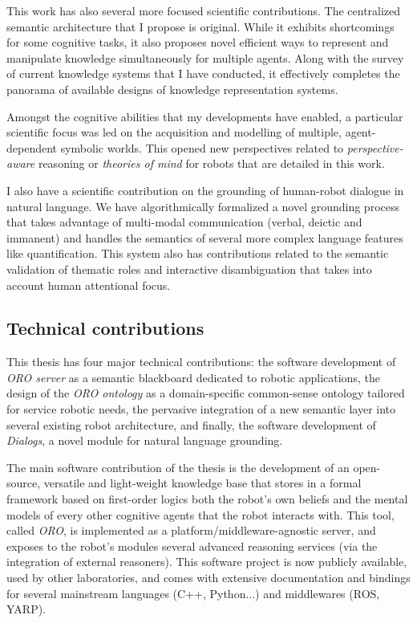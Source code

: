 This work has also several more focused scientific contributions. The
centralized semantic architecture that I propose is original. While it
exhibits shortcomings for some cognitive tasks, it also proposes novel efficient
ways to represent and manipulate knowledge simultaneously for multiple agents.
Along with the survey of current knowledge systems that I have conducted,
it effectively completes the panorama of available designs of knowledge
representation systems.

Amongst the cognitive abilities that my developments have enabled, a
particular scientific focus was led on the acquisition and modelling of
multiple, agent-dependent symbolic worlds. This opened new perspectives related
to \emph{perspective-aware} reasoning or \emph{theories of mind} for robots
that are detailed in this work.

I also have a scientific contribution on the grounding of human-robot
dialogue in natural language. We have algorithmically formalized a novel
grounding process that takes advantage of multi-modal communication (verbal,
deictic and immanent) and handles the semantics of several more complex
language features like quantification. This system also has contributions
related to the semantic validation of thematic roles and interactive
disambiguation that takes into account human attentional focus.

\subsection{Technical contributions}
\label{sect|technical-contributions}


This thesis has four major technical contributions: the software development of
\emph{ORO server} as a semantic blackboard dedicated to robotic applications,
the design of the \emph{ORO ontology} as a domain-specific common-sense
ontology tailored for service robotic needs, the pervasive integration of a new
semantic layer into several existing robot architecture, and finally, the
software development of \emph{Dialogs}, a novel module for natural language
grounding.

The main software contribution of the thesis is the development of an
open-source, versatile and light-weight knowledge base that stores in a
formal framework based on first-order logics both the robot's own beliefs and
the mental models of every other cognitive agents that the robot interacts
with. This tool, called \emph{ORO}, is implemented as a
platform/middleware-agnostic server, and exposes to the robot's modules
several advanced reasoning services (via the integration of external
reasoners). This software project is now publicly available, used by other
laboratories, and comes with extensive documentation and bindings for several
mainstream languages (C++, Python...) and middlewares (ROS, YARP).

